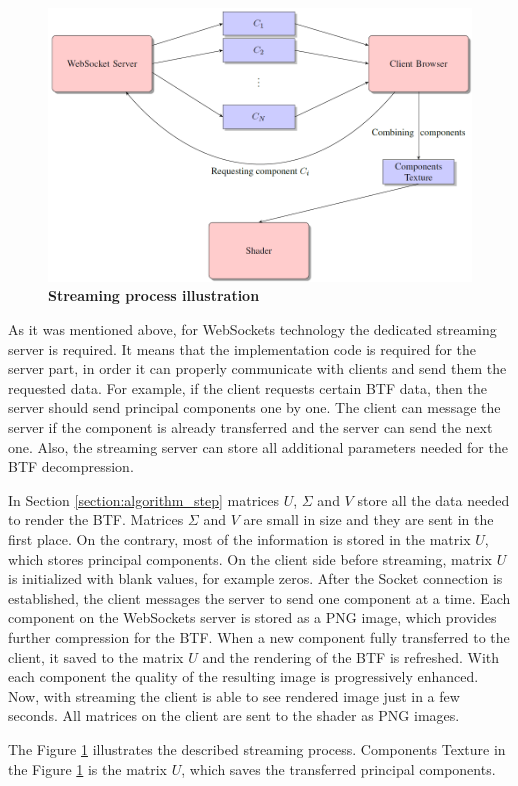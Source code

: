 \begin{figure}[h]
 \centering
 \includegraphics[width=1.0\textwidth]{figures/streaming}
 \caption[Streaming process illustration ] {
 	{\bf Streaming process illustration}
	}
 \label{fig:streaming}
\end{figure}

As it was mentioned above, for WebSockets technology the dedicated streaming server is required.
It means that the implementation code is required for the server part, in order it can properly communicate with clients and send them the requested data.
 For example, if the client requests certain BTF data, then the server should send principal components one by one. 
 The client can message the server if the component is already transferred and the server can send the next one. 
 Also, the streaming server can store all additional parameters needed for the BTF decompression.


In Section \ref{section:algorithm_step} matrices $U$, $\Sigma$ and $V$ store all the data  needed to render the BTF.
Matrices $\Sigma$ and $V$ are small in size and they are sent in the first place. On the contrary, most of the information is stored in the matrix $U$, which stores principal components.
On the client side before streaming, matrix $U$ is initialized with blank values, for example zeros. 
After the Socket connection is established, the client messages the server to send one component at a time. 
 Each component on the WebSockets server is stored as a PNG image, which provides further compression for the BTF.
When a new component fully transferred to the client, it saved to the matrix $U$ and the rendering of the BTF is refreshed.
With each component the quality of the resulting image is progressively enhanced.
Now, with streaming the client is able to see rendered image just in a few seconds.
All matrices on the client are sent to the shader as PNG images.

 The Figure \ref{fig:streaming} illustrates the described streaming process. 
 Components Texture in the Figure \ref{fig:streaming} is the matrix $U$, which saves the transferred principal components.









